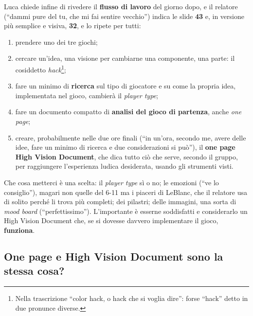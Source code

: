 Luca chiede infine di rivedere il \textbf{flusso di lavoro} del giorno dopo, e il
relatore (``dammi pure del tu, che mi fai sentire vecchio'') indica le slide
\textbf{43} e, in versione più semplice e visiva, \textbf{32}, e lo ripete per
tutti:
\begin{enumerate}
  \item prendere uno dei tre giochi;
  \item cercare un'idea, una visione per cambiarne una componente, una parte: il
        cosiddetto \emph{hack}\footnote{Nella trascrizione ``color hack, o hack
        che si voglia dire'': forse ``hack'' detto in due pronunce diverse.};
  \item fare un minimo di \textbf{ricerca} sul tipo di giocatore e su come la
        propria idea, implementata nel gioco, cambierà il \emph{player type};
  \item fare un documento compatto di \textbf{analisi del gioco di partenza},
        anche \emph{one page};
  \item creare, probabilmente nelle due ore finali (``in un'ora, secondo me,
        avere delle idee, fare un minimo di ricerca e due considerazioni si
        può''), il \textbf{one page High Vision Document}, che dica tutto ciò
        che serve, secondo il gruppo, per raggiungere l'esperienza ludica
        desiderata, usando gli strumenti visti.
\end{enumerate}
Che cosa metterci è una scelta: il \emph{player type} sì o no; le emozioni (``ve
lo consiglio''), magari non quelle del 6-11 ma i piaceri di LeBlanc, che il
relatore usa di solito perché li trova più completi; dei pilastri; delle
immagini, una sorta di \emph{mood board} (``perfettissimo''). L'importante è
esserne soddisfatti e considerarlo un High Vision Document che, se si dovesse
davvero implementare il gioco, \textbf{funziona}.

\subsection{One page e High Vision Document sono la stessa cosa?}

